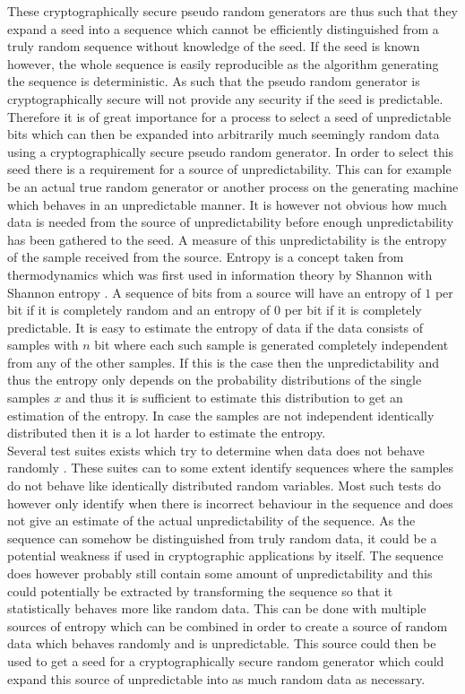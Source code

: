 \documentclass[a4paper,11pt]{report}
\begin{document}
\noindent
These cryptographically secure pseudo random generators are thus such that 
they expand a seed into a sequence which cannot be efficiently distinguished 
from a truly random sequence without knowledge of the seed. If the seed is 
known however, the whole sequence is easily reproducible as the algorithm 
generating the sequence is deterministic. As such that the pseudo random
generator is cryptographically secure will not provide any security if the seed
is predictable. Therefore it is of great importance for a process to select a 
seed of unpredictable bits which can then be expanded into arbitrarily much 
seemingly random data using a cryptographically secure pseudo random generator.
In order to select
this seed there is a requirement for a source of unpredictability. This can
for example be an actual true random generator or another process on the 
generating machine which behaves in an unpredictable manner. It is however not
obvious how much data is needed from the source of unpredictability before 
enough unpredictability has been gathered to the seed. A measure of this 
unpredictability is the entropy of the sample received from the source.
Entropy is a concept taken from thermodynamics which was first used in 
information theory by Shannon with Shannon entropy
\cite{Shannon:2001:MTC:584091.584093}.
A sequence of bits from a source will have an entropy of $1$ per bit if
it is completely random and an entropy of $0$ per bit if it is 
completely predictable. It is easy to estimate the entropy of 
data if the data consists of samples with $n$ bit where each such sample is
generated completely independent from any of the other samples. If this is the 
case then the unpredictability and thus the entropy only depends on the 
probability distributions of the single samples $x$ and thus it is sufficient
to estimate this distribution to get an estimation of the entropy.
In case the samples are not independent identically distributed then it 
is a lot harder to estimate the entropy. \\

\noindent
Several test suites exists which try to determine when data does not behave 
randomly\cite{Ecuyer2007}\cite{Bassham:2010:SRS:2206233}
\cite{brown2017dieharder}. These suites can to some extent 
identify sequences where the samples do not behave like identically distributed
random variables. Most such tests do however only identify when there is 
incorrect behaviour in the sequence and does not give an estimate of the actual
unpredictability of the sequence. As the sequence can somehow be distinguished 
from truly random data, it could be a potential weakness if used in 
cryptographic applications by itself. The sequence does however probably still
contain some amount of unpredictability and this could potentially be extracted
by transforming the sequence so that it statistically behaves more like random
data. This can be done with multiple sources of entropy which can be combined 
in order to create a source of random data which behaves randomly and is 
unpredictable. This source could then be used to get a seed for a
cryptographically secure random generator which could expand this source of 
unpredictable into as much random data as necessary.\\
\end{document}
